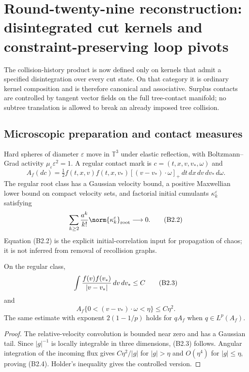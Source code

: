 \section{Round-twenty-nine reconstruction: disintegrated cut kernels and constraint-preserving loop pivots}
\label{sec:r29-b2}

The collision-history product is now defined only on kernels that admit a
specified disintegration over every cut state.  On that category it is
ordinary kernel composition and is therefore canonical and associative.
Surplus contacts are controlled by tangent vector fields on the full
tree-contact manifold; no subtree translation is allowed to break an already
imposed tree collision.

\subsection{Microscopic preparation and contact measures}

Hard spheres of diameter $\varepsilon$ move in $\mathbb T^3$ under elastic
reflection, with Boltzmann--Grad activity
$\mu_\varepsilon\varepsilon^2=1$.  A regular contact mark is
$c=(t,x,v,v_*,\omega)$ and
\[
 A_f(dc)=\tfrac12 f(t,x,v)f(t,x,v_*)[(v-v_*)\cdot\omega]_+
 \,dt\,dx\,dv\,dv_*\,d\omega.                            \tag{B2.1}
\]
The regular root class has a Gaussian velocity bound, a positive Maxwellian
lower bound on compact velocity sets, and factorial initial cumulants
$\kappa_k^\varepsilon$ satisfying
\[
 \sum_{k\ge2}{a^k\over k!}
 \norm{\kappa_k^\varepsilon}_{\rm root}\longrightarrow0. \tag{B2.2}
\]
Equation (B2.2) is the explicit initial-correlation input for propagation of
chaos; it is not inferred from removal of recollision graphs.

\begin{lemma}
\label{lem:r29-b2-relative}
On the regular class,
\[
 \int{f(v)f(v_*)\over|v-v_*|}\,dv\,dv_*\le C              \tag{B2.3}
\]
and
\[
 A_f\{0<(v-v_*)\cdot\omega<\eta\}\le C\eta^2.             \tag{B2.4}
\]
The same estimate with exponent $2(1-1/p)$ holds for
$qA_f$ when $q\in L^p(A_f)$.
\end{lemma}

\begin{proof}
The relative-velocity convolution is bounded near zero and has a Gaussian
tail.  Since $|g|^{-1}$ is locally integrable in three dimensions, (B2.3)
follows.  Angular integration of the incoming flux gives
$C\eta^2/|g|$ for $|g|>\eta$ and $O(\eta^4)$ for $|g|\le\eta$, proving
(B2.4).  Holder's inequality gives the controlled version.
\end{proof}


